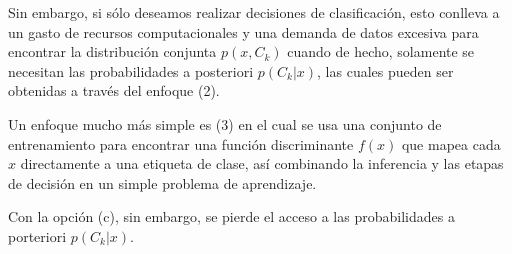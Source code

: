 	Sin embargo, si sólo deseamos realizar decisiones de clasificación, esto conlleva a un gasto de recursos computacionales y una demanda de datos excesiva para encontrar la distribución conjunta $p(x, C_k)$ cuando de hecho, solamente se necesitan las probabilidades a posteriori $p(C_k \vert x)$, las cuales pueden ser obtenidas a través del enfoque (2). 
		
	Un enfoque mucho más simple es (3) en el cual se usa una conjunto de entrenamiento para encontrar una función discriminante $f(x)$ que mapea cada $x$ directamente a una etiqueta de clase, así combinando la inferencia y las etapas de decisión en un simple problema de aprendizaje.
		
	Con la opción (c), sin embargo, se pierde el acceso a las probabilidades a porteriori $p(C_k \vert x)$. 